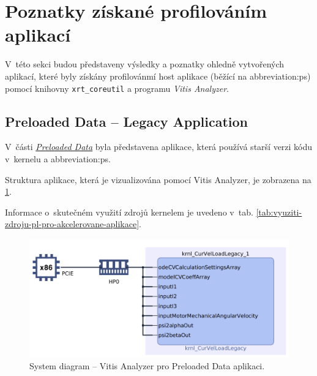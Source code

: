 \documentclass[a4paper, twoside, 11pt]{article}
\newcommand{\fbar}{\FloatBarrier}
\begin{document}
	\fbar
\section{Poznatky získané profilováním aplikací}\label{sec:poznatky-ziskane-profilovanim-aplikaci}
V~této sekci budou představeny výsledky a poznatky ohledně vytvořených aplikací, které byly získány profilovánmí host aplikace (běžící na \gls{abbreviation:ps}) pomocí knihovny \texttt{xrt\_coreutil} a programu \textit{Vitis Analyzer}.\par

	\subsection{Preloaded Data – Legacy Application}\label{subsec:poznatky-ziskane-profilovanim-aplikaci-preloaded-data-legacy-application}
		V~části \hyperref[subsec:preloaded-data]{\textit{Preloaded Data}} byla představena aplikace, která používá starší verzi kódu v~kernelu a \gls{abbreviation:ps}.\par
		Struktura aplikace, která je vizualizována pomocí Vitis Analyzer, je zobrazena na \ref{fig:legacy-rt-step-0.000001-system-diagram-crop}.\par
		Informace o~skutečném využití zdrojů kernelem je uvedeno v~tab. \ref{tab:vyuziti-zdroju-pl-pro-akcelerovane-aplikace}.\par

		\begin{figure}[htbp!]
			\centering
			\includegraphics[width=1\textwidth]{src/png/vitis-analyzer/legacy-rt/1M-data/writing-data-output/legacy-rt-step-0.000001-system-diagram-crop.png}
			\caption{System diagram – Vitis Analyzer pro Preloaded Data aplikaci.}
			\label{fig:legacy-rt-step-0.000001-system-diagram-crop}
		\end{figure}
\end{document}
